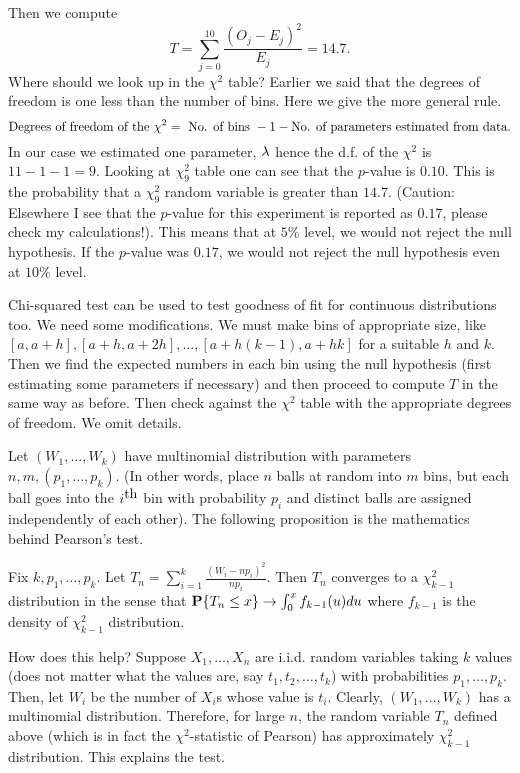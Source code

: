\documentclass[preprint,  11pt]{amsart}
\begin{document}
Then we compute
$$
 T=\sum_{j=0}^{10}\frac{(O_{j}-E_{j})^{2}}{E_{j}} = 14.7.
$$
Where should we look up in the $\chi^{2}$ table? Earlier we said that the degrees of freedom is one less than the number of bins. Here we give the more general rule.
$$
\mb{Degrees of freedom of the }\chi^{2} = \mb{ No. of bins }-1-\mb{No. of parameters estimated from data}.
$$
In our case we estimated one parameter, $\lam$ hence the d.f. of the $\chi^{2}$ is $11-1-1=9$. Looking at $\chi_{9}^{2}$ table one can see that the $p$-value is $0.10$. This is the probability that a $\chi_{9}^{2}$ random variable is greater than $14.7$. (Caution: Elsewhere I see that the $p$-value for this experiment is reported as $0.17$, please check my calculations!). This means that at $5\%$ level, we would not reject the null hypothesis. If the $p$-value was $0.17$, we would not reject the null hypothesis even at $10\%$ level.

 Chi-squared test can be used to test goodness of fit for continuous distributions too. We need some modifications. We must make bins of appropriate size, like $[a,a+h],[a+h,a+2h],\ldots ,[a+h(k-1),a+hk]$ for a suitable $h$ and $k$. Then we find the expected numbers in each bin using the null hypothesis (first estimating some parameters if necessary) and then proceed to compute $T$ in the same way as before. Then check against the $\chi^{2}$ table with the appropriate degrees of freedom. We omit details.


 Let $(W_{1},\ldots ,W_{k})$ have multinomial distribution with parameters $n,m,(p_{1},\ldots ,p_{k})$. (In other words, place $n$ balls at random into $m$ bins, but each ball goes into the $i^{\mb{th}}$ bin with probability $p_{i}$ and distinct balls are assigned independently of each other). The following proposition is the mathematics behind Pearson's test.

 Fix $k,p_{1},\ldots,p_{k}$. Let $T_{n}=\sum_{i=1}^{k}\frac{(W_{i}-np_{i})^{2}}{np_{i}}$. Then  $T_{n}$ converges to a $\chi_{k-1}^{2}$ distribution in the sense that $\P\{T_{n}\le x\}\to \int_{0}^{x}f_{k-1}(u)du$ where $f_{k-1}$ is the density of $\chi_{k-1}^{2}$ distribution.

\medskip
How does this help? Suppose $X_{1},\ldots ,X_{n}$ are i.i.d. random variables taking $k$ values (does not matter what the values are, say $t_{1},t_{2},\ldots ,t_{k}$) with probabilities $p_{1},\ldots ,p_{k}$. Then, let $W_{i}$ be the number of $X_{i}$s whose value is $t_{i}$. Clearly, $(W_{1},\ldots ,W_{k})$ has a multinomial distribution.  Therefore, for large $n$, the random variable $T_{n}$ defined above (which is in fact the $\chi^{2}$-statistic of Pearson) has approximately $\chi_{k-1}^{2}$ distribution. This explains the test.
\end{document}
